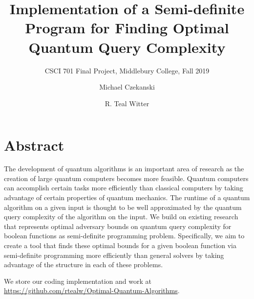\documentclass[review]{acmart}
\begin{document}
\title{Implementation of a Semi-definite Program for Finding
Optimal Quantum Query Complexity}

\subtitle{CSCI 701 Final Project, Middlebury College, Fall 2019}

\author{Michael Czekanski}

\author{R. Teal Witter}

\maketitle

\section*{Abstract}

The development of quantum algorithms is an important area of research as the creation of large quantum computers becomes more feasible. Quantum computers can accomplish certain tasks more efficiently than classical computers by taking advantage of certain properties of quantum mechanics. The runtime of a quantum algorithm on a given input is thought to be well approximated by the quantum query complexity of the algorithm on the input. We build on existing research that represents optimal adversary bounds on quantum query complexity for boolean functions as semi-definite programming problem. Specifically, we aim to create a tool that finds these optimal bounds for a given boolean function via semi-definite programming more efficiently than general solvers by taking advantage of the structure in each of these problems.

We store our coding implementation and work at
\url{https://github.com/rtealw/Optimal-Quantum-Algorithms}.










\end{document}
